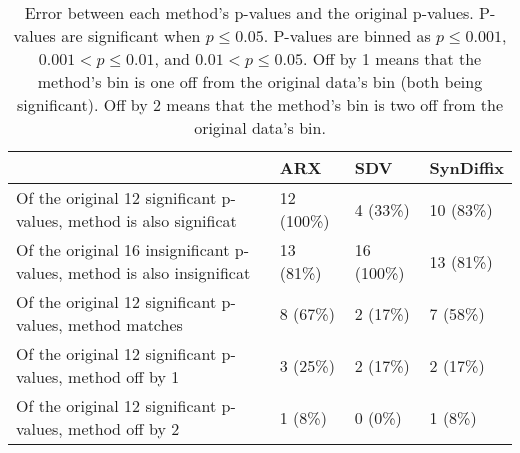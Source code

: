 
      \begin{table}
      \begin{center}
      \begin{small}
      \begin{tabular}{llll}
      \toprule
        & ARX & SDV & SynDiffix \\
      \midrule
        Of the original 12 significant p-values, method is also significat  & 12 (100\%)  & 4 (33\%)  & 10 (83\%)  \\ 
    Of the original 16 insignificant p-values, method is also insignificat  & 13 (81\%)  & 16 (100\%)  & 13 (81\%)  \\ 
    Of the original 12 significant p-values, method matches  & 8 (67\%)  & 2 (17\%)  & 7 (58\%)  \\ 
    Of the original 12 significant p-values, method off by 1  & 3 (25\%)  & 2 (17\%)  & 2 (17\%)  \\ 
    Of the original 12 significant p-values, method off by 2  & 1 (8\%)  & 0 (0\%)  & 1 (8\%)  \\ 

      \bottomrule
      \end{tabular}
      \end{small}
      \caption{Error between each method's p-values and the original p-values. P-values are significant when $p \leq 0.05$. P-values are binned as $p \leq 0.001$, $0.001 < p \leq 0.01$, and $0.01 < p \leq 0.05$. Off by 1 means that the method's bin is one off from the original data's bin (both being significant). Off by 2 means that the method's bin is two off from the original data's bin.
      }
      \label{tab:p_table}
      \end{center}
      \end{table}
    